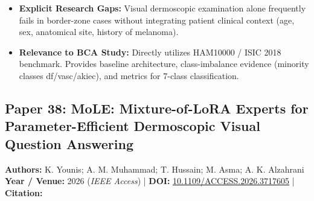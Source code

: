 \documentclass[11pt,a4paper]{article}
\begin{document}
\begin{itemize}
\item \textbf{Explicit Research Gaps:} Visual dermoscopic examination alone frequently fails in border-zone cases without integrating patient clinical context (age, sex, anatomical site, history of melanoma).
\item \textbf{Relevance to BCA Study:} Directly utilizes HAM10000 / ISIC 2018 benchmark. Provides baseline architecture, class-imbalance evidence (minority classes df/vasc/akiec), and metrics for 7-class classification.
\end{itemize}

\subsection{Paper 38: MoLE: Mixture-of-LoRA Experts for Parameter-Efficient Dermoscopic Visual Question Answering}
\textbf{Authors:} K. Younis; A. M. Muhammad; T. Hussain; M. Asma; A. K. Alzahrani \\
\textbf{Year / Venue:} 2026 (\textit{IEEE Access}) | \textbf{DOI:} \href{https://doi.org/10.1109/ACCESS.2026.3717605}{10.1109/ACCESS.2026.3717605} | \textbf{Citation:} \cite{11626860}
\end{document}
